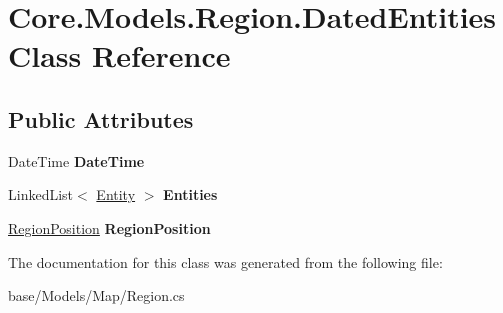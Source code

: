 \hypertarget{classCore_1_1Models_1_1Region_1_1DatedEntities}{\section{Core.\-Models.\-Region.\-Dated\-Entities Class Reference}
\label{classCore_1_1Models_1_1Region_1_1DatedEntities}
}
\subsection*{Public Attributes}
\begin{DoxyCompactItemize}
\item 
\hypertarget{classCore_1_1Models_1_1Region_1_1DatedEntities_aef27626e67d6fbe5e549f57bf1233571}{Date\-Time {\bfseries Date\-Time}}\label{classCore_1_1Models_1_1Region_1_1DatedEntities_aef27626e67d6fbe5e549f57bf1233571}

\item 
\hypertarget{classCore_1_1Models_1_1Region_1_1DatedEntities_aaa8cacb9e8c527149f8176ad2b473bdc}{Linked\-List$<$ \hyperlink{classCore_1_1Models_1_1Entity}{Entity} $>$ {\bfseries Entities}}\label{classCore_1_1Models_1_1Region_1_1DatedEntities_aaa8cacb9e8c527149f8176ad2b473bdc}

\item 
\hypertarget{classCore_1_1Models_1_1Region_1_1DatedEntities_a9f7508c71a4e63dd41df20a6699c4359}{\hyperlink{classCore_1_1Models_1_1RegionPosition}{Region\-Position} {\bfseries Region\-Position}}\label{classCore_1_1Models_1_1Region_1_1DatedEntities_a9f7508c71a4e63dd41df20a6699c4359}

\end{DoxyCompactItemize}


The documentation for this class was generated from the following file\-:\begin{DoxyCompactItemize}
\item 
base/\-Models/\-Map/Region.\-cs\end{DoxyCompactItemize}
